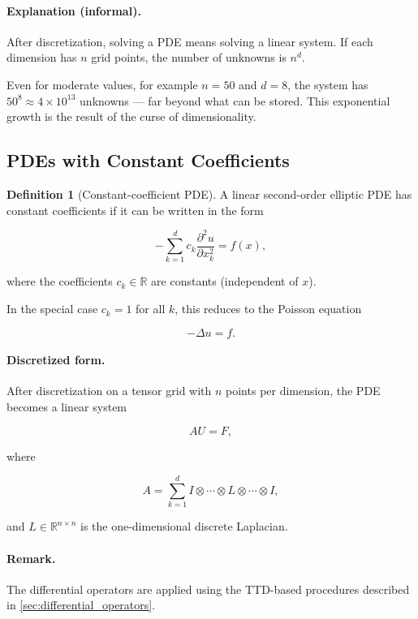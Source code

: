 \documentclass[11pt,a4paper,parskip=half-]{scrartcl}
\theoremstyle{definition}
\newtheorem{definition}{Definition}[section]
\theoremstyle{plain}
\theoremstyle{remark}
\begin{document}
\paragraph{Explanation (informal).}

After discretization, solving a PDE means solving a linear system. If each
dimension has $n$ grid points, the number of unknowns is $n^d$.

Even for moderate values, for example $n=50$ and $d=8$, the system has $50^8
\approx 4 \times 10^{13}$ unknowns — far beyond what can be stored. This
exponential growth is the result of the curse of dimensionality.

\subsection{PDEs with Constant Coefficients}
\begin{definition}[Constant-coefficient PDE]

  A linear second-order elliptic PDE has constant coefficients
  if it can be written in the form

  \[
    -\sum_{k=1}^d c_k \frac{\partial^2 u}{\partial x_k^2}
    = f(x),
  \]

  where the coefficients $c_k \in \mathbb{R}$ are constants (independent of
  $x$).

  In the special case $c_k = 1$ for all $k$, this reduces to the Poisson
  equation

  \[
    -\Delta u = f.
  \]

\end{definition}
\paragraph{Discretized form.}

After discretization on a tensor grid with $n$ points per dimension,
the PDE becomes a linear system

\[
  A U = F,
\]

where

\[
  A
  =
  \sum_{k=1}^d
  I \otimes \cdots \otimes
  L
  \otimes \cdots \otimes I,
\]

and $L \in \mathbb{R}^{n \times n}$ is the one-dimensional discrete Laplacian.

\paragraph{Remark.}

The differential operators are applied using the TTD-based
procedures described in \cref{sec:differential_operators}.
\end{document}
